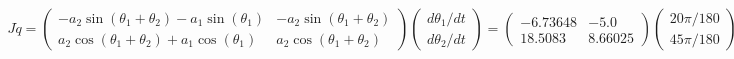 \[\begin{aligned}
J\dot{q} = \begin{pmatrix}  -a_2\sin(\theta_1+\theta_2) - a_1\sin(\theta_1) & -a_2\sin(\theta_1+\theta_2)  \\[2mm]
  a_2\cos (\theta_1+\theta_2) + a_1 \cos (\theta_1) & a_2\cos (\theta_1+\theta_2)  \end{pmatrix}
  \begin{pmatrix} d\theta_1/dt \\ d\theta_2 /dt\end{pmatrix}
  =
   \begin{pmatrix} -6.73648 & -5.0 \\  18.5083  &  8.66025 \end{pmatrix}
    \begin{pmatrix} 20\pi/180 \\ 45\pi/180 \end{pmatrix}
    =  \begin{pmatrix}  -6.866335492 \\  14.87753073867 \end{pmatrix}
\end{aligned}\]

\hypertarget{listvelocity}{%
\label{listvelocity}}%
\begin{Shaded}
\begin{Highlighting}[]
 \OperatorTok{=} \OperatorTok{*}\OperatorTok{/}
 \OperatorTok{=} \OperatorTok{*}\OperatorTok{/}
\OperatorTok{=}\OperatorTok{=} 
\OperatorTok{=} \OperatorTok{{-}}\OperatorTok{*}\OperatorTok{+}\NormalTok{) }\OperatorTok{{-}}\OperatorTok{*}\NormalTok{)}
\OperatorTok{=} \OperatorTok{{-}}\OperatorTok{*}\OperatorTok{+}\NormalTok{)}
\OperatorTok{=}\OperatorTok{*}\OperatorTok{+}\NormalTok{) }\OperatorTok{+}\OperatorTok{*}\NormalTok{)}
\OperatorTok{=}\OperatorTok{*}\OperatorTok{+}\NormalTok{)}
\OperatorTok{=}\NormalTok{ [ j11 j12 }\OperatorTok{;}\NormalTok{ j21 j22]}
\OperatorTok{=}\NormalTok{ [}\OperatorTok{*}\OperatorTok{/} \OperatorTok{;} \OperatorTok{*}\OperatorTok{/}\NormalTok{]}
\OperatorTok{*}
\end{Highlighting}
\end{Shaded}

